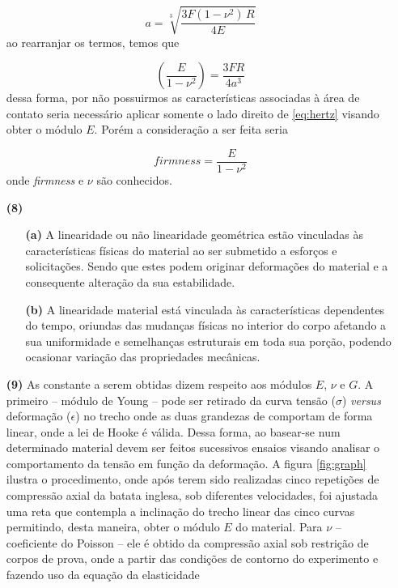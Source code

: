 \documentclass[a4paper, 12pt, brazilian]{article}
\begin{document}
\begin{itemize}
		\begin{equation}
			a=\sqrt[3]{\dfrac{3F(1-\nu^{2})\,R}{4E}}
		\end{equation}
		ao rearranjar os termos, temos que
		
		\begin{equation}
			\label{eq:hertz}
			\left(\dfrac{E}{1-\nu^{2}}\right)=\dfrac{3FR}{4a^{3}}
		\end{equation}
		dessa forma, por não possuirmos as características associadas à área de contato seria necessário aplicar somente o lado direito de \eqref{eq:hertz} visando obter o módulo $E$. Porém a consideração a ser feita seria
		
		\begin{equation}
			\textit{firmness}=\dfrac{E}{1-\nu^{2}}
		\end{equation}
		onde \textit{firmness} e $\nu$ são conhecidos.
	
		\item[\textbf{(8)}]		
		
		\begin{itemize}
			\item[\textbf{(a)}] A linearidade ou não linearidade geométrica estão vinculadas às características físicas do material ao ser submetido a esforços e solicitações. Sendo que estes podem originar deformações do material e a consequente alteração da sua estabilidade.
			\item[\textbf{(b)}] A linearidade material está vinculada às características dependentes do tempo, oriundas das mudanças físicas no interior do corpo afetando a sua uniformidade e semelhanças estruturais em toda sua porção, podendo ocasionar variação das propriedades mecânicas.
		\end{itemize}
	
		\item[\textbf{(9)}] As constante a serem obtidas dizem respeito aos módulos $E$, $\nu$ e $G$. A primeiro -- módulo de Young -- pode ser retirado da curva tensão ($\sigma$) \textit{versus} deformação ($\epsilon$) no trecho onde as duas grandezas de comportam de forma linear, onde a lei de Hooke é válida. Dessa forma, ao basear-se num determinado material devem ser feitos sucessivos ensaios visando analisar o comportamento da tensão em função da deformação. A figura \cref{fig:graph} ilustra o procedimento, onde após terem sido realizadas cinco repetições de compressão axial da batata inglesa, sob diferentes velocidades, foi ajustada uma reta que contempla a inclinação do trecho linear das cinco curvas permitindo, desta maneira, obter o módulo $E$ do material. Para $\nu$ -- coeficiente do Poisson -- ele é obtido da compressão axial sob restrição de corpos de prova, onde a partir das condições de contorno do experimento e fazendo uso da equação da elasticidade 
		

\end{itemize}
\end{document}
